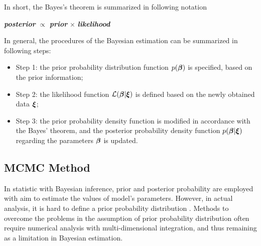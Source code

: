 In short, the Bayes's theorem is summarized in following notation
\begin{center}
\textbf{\textit{posterior}} \hspace{2mm} $\propto$ \textbf{\textit{prior}} $\times$ \textbf{\textit{likelihood}}
\end{center}
In general, the procedures of the Bayesian estimation can be summarized in following steps:
\begin{itemize}
	\item Step 1: the prior probability distribution function $p(\mbox{\boldmath$\beta$})$ is specified, based on the prior information;
	\item Step 2: the likelihood function ${\cal L}(\mbox{\boldmath$\beta$}|\mbox{\boldmath$\xi$})$ is defined based on the newly obtained data $\mbox{\boldmath$\xi$}$;
	\item Step 3: the prior probability density function is modified in accordance with the Bayes' theorem, and the posterior probability density function $p(\mbox{\boldmath$\beta$}|\mbox{\boldmath$\xi$})$ regarding the parameters $\mbox{\boldmath$\beta$}$ is updated.
\end{itemize}

\subsection{MCMC Method} \label{sec51}
In statistic with Bayesian inference, prior and posterior probability are employed with aim to estimate the values of model's parameters. However, in actual analysis, it is hard to define a prior probability distribution \citep{ibrahim01bo}. Methods to overcome the problems in the assumption of prior probability distribution often require numerical analysis with multi-dimensional integration, and thus remaining as a limitation in Bayesian estimation.

